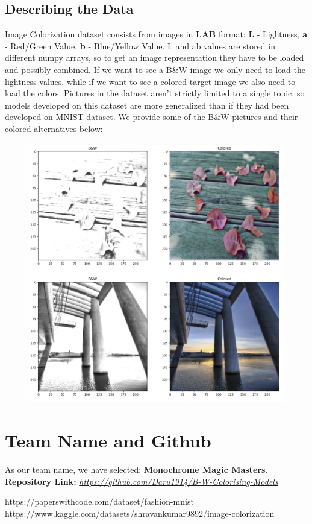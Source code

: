\documentclass[]{article}
\begin{document}
	\subsection{Describing the Data}
	
	Image Colorization dataset consists from images in \textbf{LAB} format: \textbf{L} - Lightness, \textbf{a} - Red/Green Value, \textbf{b} - Blue/Yellow Value. L and ab values are stored in different numpy arrays, so to get an image representation they have to be loaded and possibly combined. If we want to see a B\&W image we only need to load the lightness values, while if we want to see a colored target image we also need to load the colors. Pictures in the dataset aren't strictly limited to a single topic, so models developed on this dataset are more generalized than if they had been developed on MNIST dataset. We provide some of the B\&W pictures and their colored alternatives below:
	\begin{figure}[H]
		\includegraphics{image1.png}
	\end{figure}
	
	\section{Team Name and Github}
	
	As our team name, we have selected: \textbf{Monochrome Magic Masters}.\\
	
	\textbf{Repository Link: }\href{https://github.com/Daru1914/B-W-Colorising-Models}{\emph{https://github.com/Daru1914/B-W-Colorising-Models}}
	
	\begin{thebibliography}{9}
		 https://paperswithcode.com/dataset/fashion-mnist
		https://www.kaggle.com/datasets/shravankumar9892/image-colorization
	\end{thebibliography}
	
\end{document}
